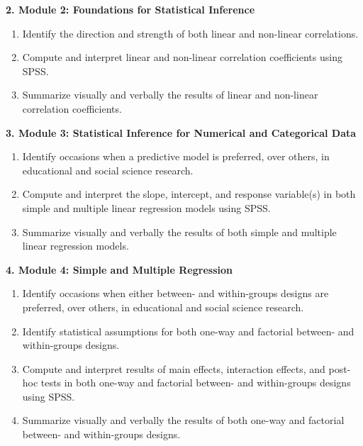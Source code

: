 \documentclass[
]{article}
\providecommand{\tightlist}{%
  \setlength{\itemsep}{0pt}\setlength{\parskip}{0pt}}
\begin{document}
\textbf{2. Module 2: Foundations for Statistical Inference}

\begin{enumerate}
\def\labelenumi{\arabic{enumi}.}
\tightlist
\item
  Identify the direction and strength of both linear and non-linear
  correlations.
\item
  Compute and interpret linear and non-linear correlation coefficients
  using SPSS.
\item
  Summarize visually and verbally the results of linear and non-linear
  correlation coefficients.
\end{enumerate}

\textbf{3. Module 3: Statistical Inference for Numerical and Categorical
Data}

\begin{enumerate}
\def\labelenumi{\arabic{enumi}.}
\tightlist
\item
  Identify occasions when a predictive model is preferred, over others,
  in educational and social science research.
\item
  Compute and interpret the slope, intercept, and response variable(s)
  in both simple and multiple linear regression models using SPSS.
\item
  Summarize visually and verbally the results of both simple and
  multiple linear regression models.
\end{enumerate}

\textbf{4. Module 4: Simple and Multiple Regression}

\begin{enumerate}
\def\labelenumi{\arabic{enumi}.}
\tightlist
\item
  Identify occasions when either between- and within-groups designs are
  preferred, over others, in educational and social science research.
\item
  Identify statistical assumptions for both one-way and factorial
  between- and within-groups designs.
\item
  Compute and interpret results of main effects, interaction effects,
  and post-hoc tests in both one-way and factorial between- and
  within-groups designs using SPSS.
\item
  Summarize visually and verbally the results of both one-way and
  factorial between- and within-groups designs.
\end{enumerate}
\end{document}
